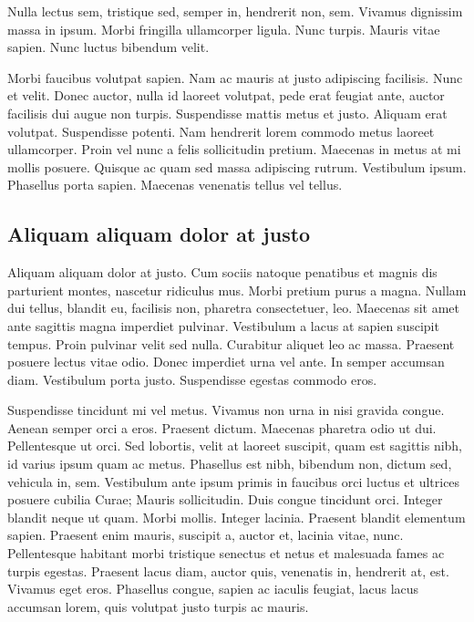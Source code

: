 \documentclass[../hdr.tex]{subfiles}
\begin{document}
Nulla lectus sem, tristique sed, semper in, hendrerit non, sem. Vivamus
dignissim massa in ipsum. Morbi fringilla ullamcorper ligula. Nunc turpis.
Mauris vitae sapien. Nunc luctus bibendum velit.

Morbi faucibus volutpat sapien. Nam ac mauris at justo adipiscing facilisis.
Nunc et velit. Donec auctor, nulla id laoreet volutpat, pede erat feugiat ante,
auctor facilisis dui augue non turpis. Suspendisse mattis metus et justo.
Aliquam erat volutpat. Suspendisse potenti. Nam hendrerit lorem commodo metus
laoreet ullamcorper. Proin vel nunc a felis sollicitudin pretium. Maecenas in
metus at mi mollis posuere. Quisque ac quam sed massa adipiscing rutrum.
Vestibulum ipsum. Phasellus porta sapien. Maecenas venenatis tellus vel tellus.

\subsection{Aliquam aliquam dolor at justo}

Aliquam aliquam dolor at justo. Cum sociis natoque penatibus et magnis dis
parturient montes, nascetur ridiculus mus. Morbi pretium purus a magna. Nullam
dui tellus, blandit eu, facilisis non, pharetra consectetuer, leo. Maecenas sit
amet ante sagittis magna imperdiet pulvinar. Vestibulum a lacus at sapien
suscipit tempus. Proin pulvinar velit sed nulla. Curabitur aliquet leo ac massa.
Praesent posuere lectus vitae odio. Donec imperdiet urna vel ante. In semper
accumsan diam. Vestibulum porta justo. Suspendisse egestas commodo eros.

Suspendisse tincidunt mi vel metus. Vivamus non urna in nisi gravida congue.
Aenean semper orci a eros. Praesent dictum. Maecenas pharetra odio ut dui.
Pellentesque ut orci. Sed lobortis, velit at laoreet suscipit, quam est sagittis
nibh, id varius ipsum quam ac metus. Phasellus est nibh, bibendum non, dictum
sed, vehicula in, sem. Vestibulum ante ipsum primis in faucibus orci luctus et
ultrices posuere cubilia Curae; Mauris sollicitudin. Duis congue tincidunt orci.
Integer blandit neque ut quam. Morbi mollis. Integer lacinia. Praesent blandit
elementum sapien. Praesent enim mauris, suscipit a, auctor et, lacinia vitae,
nunc. Pellentesque habitant morbi tristique senectus et netus et malesuada fames
ac turpis egestas. Praesent lacus diam, auctor quis, venenatis in, hendrerit at,
est. Vivamus eget eros. Phasellus congue, sapien ac iaculis feugiat, lacus lacus
accumsan lorem, quis volutpat justo turpis ac mauris.
\end{document}
